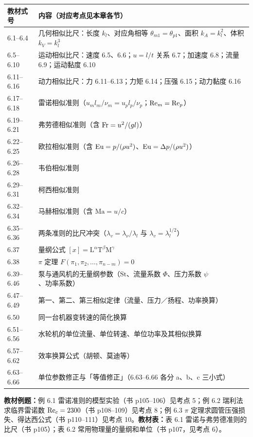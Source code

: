 \begin{center}
{\small
\begin{tabularx}{\textwidth}{@{}lX@{}}
\toprule
教材式号 & 内容（对应考点见本章各节） \\
\midrule
6.1--6.4 & 几何相似比尺：长度 $k_l$、对应角相等 $\theta_{m1}=\theta_{p1}$、面积 $k_A=k_l^{2}$、体积 $k_V=k_l^{3}$ \\
6.5--6.10 & 运动相似比尺：速度 6.5、6.6；$u=l/t$ 关系 6.7；加速度 6.8；流量 6.9；运动黏度 6.10 \\
6.11--6.16 & 动力相似比尺：力 6.11--6.13；力矩 6.14；压强 6.15；动力黏度 6.16 \\
6.17--6.18 & 雷诺相似准则（$u_ml_m/\nu_m=u_pl_p/\nu_p$；$\mathrm{Re}_m=\mathrm{Re}_p$） \\
6.19--6.21 & 弗劳德相似准则（含 $\mathrm{Fr}=u^{2}/(gl)$） \\
6.22--6.25 & 欧拉相似准则（含 $\mathrm{Eu}=p/(\rho u^{2})$、$\mathrm{Eu}=\Delta p/(\rho u^{2})$） \\
6.26--6.28 & 韦伯相似准则 \\
6.29--6.31 & 柯西相似准则 \\
6.32--6.34 & 马赫相似准则（含 $\mathrm{Ma}=u/c$） \\
6.35--6.36 & 两条准则的比尺冲突（$\lambda_v=\lambda_\nu/\lambda_l$ 与 $\lambda_v=\lambda_l^{1/2}$） \\
6.37 & 量纲公式 $[x]=\mathrm{L}^{\alpha}\mathrm{T}^{\beta}\mathrm{M}^{\gamma}$ \\
6.38 & $\pi$ 定理 $F(\pi_1,\pi_2,\dots,\pi_{n-m})=0$ \\
6.39--6.46 & 泵与通风机的无量纲参数（$\mathrm{St}$、流量系数 $\Phi$、压力系数 $\psi$、功率系数） \\
6.47--6.49 & 第一、第二、第三相似定律（流量、压力／扬程、功率换算） \\
6.50 & 同一台机器变转速的简化换算 \\
6.51--6.56 & 水轮机的单位流量、单位转速、单位功率及其相似换算 \\
6.57--6.62 & 效率换算公式（胡顿、莫迪等） \\
6.63--6.66 & 单位参数修正与「等值修正」（6.63--6.66 各分 a、b、c 三小式） \\
\bottomrule
\end{tabularx}
}
\end{center}

\textbf{教材例题：}例 6.1 雷诺准则的模型实验（书 p105--106）见考点 5；例 6.2 瑞利法求临界雷诺数 $\mathrm{Re}_c=2300$（书 p108--109）见考点 8；例 6.3 $\pi$ 定理求圆管压强损失、得达西公式（书 p110--111）见考点 10。\textbf{教材表：}表 6.1 雷诺与弗劳德准则的比尺（书 p105）；表 6.2 常用物理量的量纲和单位（书 p107，见考点 6）。
